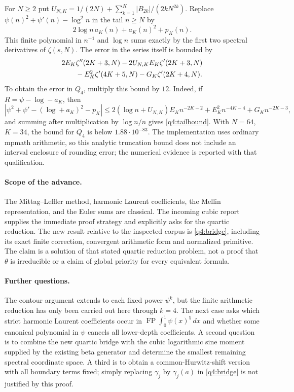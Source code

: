 For $N\geq2$ put
$U_{N,K}=1/(2N)+\sum_{k=1}^K|B_{2k}|/(2kN^{2k})$.
Replace $\psi(n)^2+\psi'(n)-\log^2n$ in the tail $n\geq N$ by
\[
 2\log n\,a_K(n)+a_K(n)^2+p_K(n).
\]
This finite polynomial in $n^{-1}$ and $\log n$ sums exactly by the first
two spectral derivatives of $\zeta(s,N)$.  The error in the series
itself is bounded by
\begin{align}\label{q4:tailbound}
 &2E_K\zeta''(2K+3,N)
    -2U_{N,K}E_K\zeta'(2K+3,N)\notag\\
 &\qquad{}-E_K^2\zeta'(4K+5,N)
    -G_K\zeta'(2K+4,N).
\end{align}
To obtain the error in $Q_4$, multiply this bound by $12$.
Indeed, if $R=\psi-\log-a_K$, then
\[
 |\psi^2+\psi'-(\log+a_K)^2-p_K|
 \leq2(\log n+U_{N,K})E_Kn^{-2K-2}
          +E_K^2n^{-4K-4}+G_Kn^{-2K-3},
\]
and summing after multiplication by $\log n/n$ gives
\eqref{q4:tailbound}.  With $N=64$, $K=34$, the bound for $Q_4$ is
below $1.88\cdot10^{-83}$.  The implementation uses ordinary mpmath
arithmetic, so this analytic truncation bound does not include an
interval enclosure of rounding error; the numerical evidence is
reported with that qualification.

\paragraph{Scope of the advance.}
The Mittag--Leffler method, harmonic Laurent coefficients, the Mellin
representation, and the Euler sums are classical.  The incoming cubic
report supplies the immediate proof strategy and explicitly asks for
the quartic reduction.  The new result relative to the inspected corpus
is \eqref{q4:bridge}, including its exact finite correction, convergent
arithmetic form and normalized primitive.  The claim is a solution of
that stated quartic reduction problem, not a proof that $\theta$ is
irreducible or a claim of global priority for every equivalent formula.

\paragraph{Further questions.}
The contour argument extends to each fixed power $\psi^k$, but the finite
arithmetic reduction has only been carried out here through $k=4$.
The next case asks which strict harmonic Laurent coefficients occur in
$\operatorname{FP}\int_0^1\psi(x)^5\,dx$ and whether some canonical
polynomial in $\psi$ cancels all lower-depth coefficients.  A second
question is to combine the new quartic bridge with the cubic logarithmic
sine moment supplied by the existing beta generator and determine the
smallest remaining spectral coordinate space.  A third is to obtain a
common-Hurwitz-shift version with all boundary terms fixed; simply
replacing $\gamma_j$ by $\gamma_j(a)$ in \eqref{q4:bridge} is not
justified by this proof.
